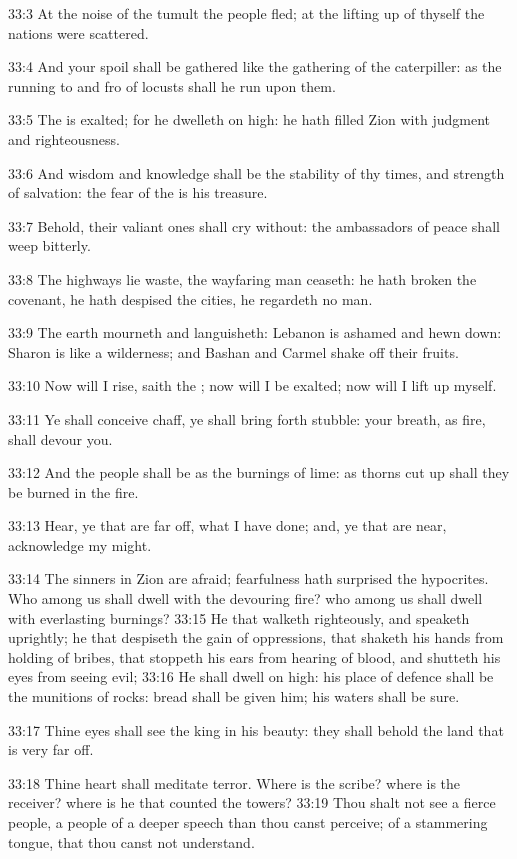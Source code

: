 33:3 At the noise of the tumult the people fled; at the lifting up of
thyself the nations were scattered.

33:4 And your spoil shall be gathered like the gathering of the
caterpiller: as the running to and fro of locusts shall he run upon
them.

33:5 The \LORD is exalted; for he dwelleth on high: he hath filled Zion
with judgment and righteousness.

33:6 And wisdom and knowledge shall be the stability of thy times, and
strength of salvation: the fear of the \LORD is his treasure.

33:7 Behold, their valiant ones shall cry without: the ambassadors of
peace shall weep bitterly.

33:8 The highways lie waste, the wayfaring man ceaseth: he hath broken
the covenant, he hath despised the cities, he regardeth no man.

33:9 The earth mourneth and languisheth: Lebanon is ashamed and hewn
down: Sharon is like a wilderness; and Bashan and Carmel shake off
their fruits.

33:10 Now will I rise, saith the \LORD; now will I be exalted; now will
I lift up myself.

33:11 Ye shall conceive chaff, ye shall bring forth stubble: your
breath, as fire, shall devour you.

33:12 And the people shall be as the burnings of lime: as thorns cut
up shall they be burned in the fire.

33:13 Hear, ye that are far off, what I have done; and, ye that are
near, acknowledge my might.

33:14 The sinners in Zion are afraid; fearfulness hath surprised the
hypocrites. Who among us shall dwell with the devouring fire? who
among us shall dwell with everlasting burnings?  33:15 He that walketh
righteously, and speaketh uprightly; he that despiseth the gain of
oppressions, that shaketh his hands from holding of bribes, that
stoppeth his ears from hearing of blood, and shutteth his eyes from
seeing evil; 33:16 He shall dwell on high: his place of defence shall
be the munitions of rocks: bread shall be given him; his waters shall
be sure.

33:17 Thine eyes shall see the king in his beauty: they shall behold
the land that is very far off.

33:18 Thine heart shall meditate terror. Where is the scribe? where is
the receiver? where is he that counted the towers?  33:19 Thou shalt
not see a fierce people, a people of a deeper speech than thou canst
perceive; of a stammering tongue, that thou canst not understand.

